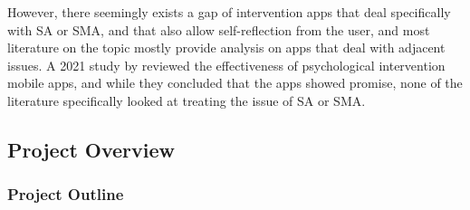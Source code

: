 \documentclass[12pt]{article}
\begin{document}

However, there seemingly exists a gap of intervention apps that deal specifically with SA or SMA, and that also 
allow self-reflection from the user, and most literature on the topic mostly provide 
analysis on apps that deal with adjacent issues. A 2021 study by \textcite{RefWorks:RefID:75-oliveira2021effectiveness} 
reviewed the effectiveness of psychological intervention mobile apps, and while they 
concluded that the apps showed promise, none of 
the literature specifically looked at treating the issue of SA or SMA.\newline 



\subsection{Project Overview}

\subsubsection{Project Outline}

\end{document}
